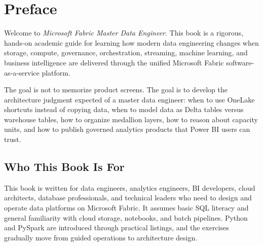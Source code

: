 \chapter*{Preface}
Welcome to \textit{Microsoft Fabric Master Data Engineer}. This book is a rigorous, hands-on academic guide for learning how modern data engineering changes when storage, compute, governance, orchestration, streaming, machine learning, and business intelligence are delivered through the unified Microsoft Fabric software-as-a-service platform.

The goal is not to memorize product screens. The goal is to develop the architecture judgment expected of a master data engineer: when to use OneLake shortcuts instead of copying data, when to model data as Delta tables versus warehouse tables, how to organize medallion layers, how to reason about capacity units, and how to publish governed analytics products that Power BI users can trust.

\section*{Who This Book Is For}
This book is written for data engineers, analytics engineers, BI developers, cloud architects, database professionals, and technical leaders who need to design and operate data platforms on Microsoft Fabric. It assumes basic SQL literacy and general familiarity with cloud storage, notebooks, and batch pipelines. Python and PySpark are introduced through practical listings, and the exercises gradually move from guided operations to architecture design.

